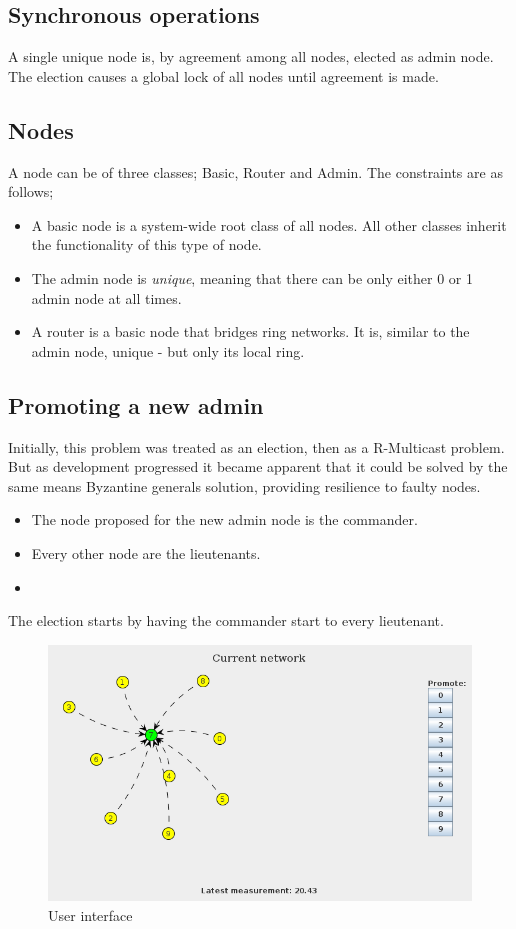 \documentclass[10pt,a4paper]{article}
\begin{document}
\subsection{Synchronous operations}

A single unique node is, by agreement among all nodes, elected as admin node. The election causes a global lock of all nodes until agreement is made.
\subsection{Nodes}
A node can be of three classes; Basic, Router and Admin. The constraints are as follows;
\begin{itemize}
\item A basic node is a system-wide root class of all nodes. All other classes inherit the functionality of this type of node.
\item The admin node is \emph{unique}, meaning that there can be only either 0 or 1 admin node at all times.
\item A router is a basic node that bridges ring networks. It is, similar to the admin node, unique - but only its local ring.
\end{itemize}


\subsection{Promoting a new admin}
Initially, this problem was treated as an election, then as a R-Multicast problem. But as development progressed it became apparent that it could be solved by the same means Byzantine generals solution, providing resilience to faulty nodes.
\begin{itemize}
\item The node proposed for the new admin node is the commander.
\item Every other node are the lieutenants.
\item 
\end{itemize}

The election starts by having the commander start  %
to every lieutenant.

\begin{figure}[H]
\centering
\includegraphics[scale=0.4]{fig/UI.png}
 \caption{User interface}
 \label{fig:ui}
\end{figure}
\end{document}
